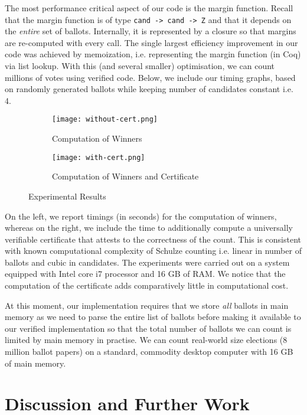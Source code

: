\documentclass{llncs}
\begin{document}
The most performance critical aspect of our code is the margin
function. Recall that the margin function is of type
\texttt{cand -> cand -> Z}
and that it depends on the \emph{entire} set of ballots. Internally, it is
represented by a closure \cite{Landin:1964:MEE} so that margins are
re-computed with every call. The single largest efficiency
improvement in our code was achieved by memoization, i.e.
representing the margin function (in Coq) via list lookup. With
this (and several smaller) optimisation, we can count millions of
votes using verified code. Below, we include our timing graphs,
based on randomly generated ballots while keeping number of candidates
constant i.e. 4. 

\begin{figure}
\centering
\begin{subfigure}{.5\textwidth}
  \centering
  \texttt{[image: without-cert.png]}
  \caption{Computation of Winners}
  \label{fig:straight}
\end{subfigure}%
\begin{subfigure}{.5\textwidth}
  \centering
  \texttt{[image: with-cert.png]}
  \caption{Computation of Winners and Certificate}
  \label{fig:native}
\end{subfigure}
\caption{Experimental Results}
\end{figure}

\noindent
On the left, we report timings (in seconds) for the computation of
winners, whereas on the right, we include the time to additionally
compute a universally verifiable certificate that attests  to the
correctness of the count. This is consistent with known computational 
complexity of Schulze 
counting i.e. linear in number of ballots and cubic in candidates. 
The experiments were carried out on a system 
equipped with Intel core i7 processor and 16 GB of RAM. We notice that the
computation of the certificate adds comparatively little in
computational cost. 

At this moment, our implementation requires that we store \emph{all}
ballots in main memory as we need to parse the entire list of
ballots before making it available to our verified implementation so
that the total number of ballots we can count is limited by main
memory in practise. We can count real-world size elections (8
million ballot papers) on a standard, commodity desktop computer with
16 GB of main memory. 

\section{Discussion and Further Work}
\end{document}
